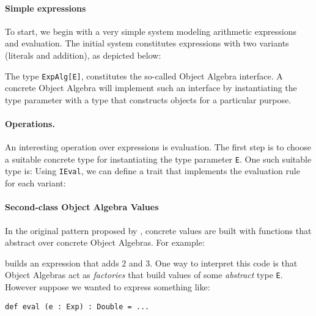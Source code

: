 \paragraph{Simple expressions}
To start, we begin with a very simple system modeling arithmetic expressions and
evaluation. The initial system constitutes expressions with two variants
(literals and addition), as depicted below:

\noindent The type \lstinline{ExpAlg[E]}, constitutes the so-called Object
Algebra interface. A concrete Object Algebra will implement such an interface by
instantiating the type parameter with a type that constructs objects for a
particular purpose.


\paragraph{Operations.} An interesting operation over expressions is
evaluation. The first step is to choose a suitable concrete type for
instantiating the type parameter \lstinline{E}. One such suitable type is:
Using \lstinline{IEval}, we can define a trait that implements the evaluation
rule for each variant:

\paragraph{Second-class Object Algebra Values} In the original pattern
proposed by \citet{oliveira2012extensibility}, concrete values are built with
functions that abstract over concrete Object Algebras. For example:


\noindent builds an expression that adds $2$ and $3$. One way to
interpret this code is that Object Algebras act as \emph{factories}
that build values of some \emph{abstract} type \lstinline{E}. However
suppose we wanted to express something like:

\begin{lstlisting}
def eval (e : Exp) : Double = ...
\end{lstlisting}

